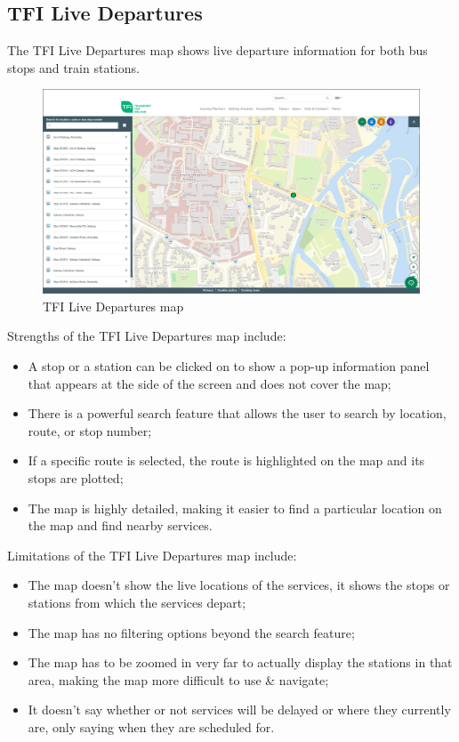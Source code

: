 \documentclass[a4paper,11pt]{report}
\begin{document}
\subsection{TFI Live Departures}
The TFI Live Departures map\supercite{tfilive} shows live departure information for both bus stops and train stations.
\begin{figure}[H]
    \centering
    \includegraphics[width=\textwidth]{../PDD/images/tfi.png}
    \caption{TFI Live Departures map}
\end{figure}

Strengths of the TFI Live Departures map include:
\begin{itemize}
    \item   A stop or a station can be clicked on to show a pop-up information panel that appears at the side of the screen and does not cover the map;
    \item   There is a powerful search feature that allows the user to search by location, route, or stop number;
    \item   If a specific route is selected, the route is highlighted on the map and its stops are plotted;
    \item   The map is highly detailed, making it easier to find a particular location on the map and find nearby services.
\end{itemize}

Limitations of the TFI Live Departures map include:
\begin{itemize}
    \item   The map doesn't show the live locations of the services, it shows the stops or stations from which the services depart;
    \item   The map has no filtering options beyond the search feature;
    \item   The map has to be zoomed in very far to actually display the stations in that area, making the map more difficult to use \& navigate;
    \item   It doesn't say whether or not services will be delayed or where they currently are, only saying when they are scheduled for.
\end{itemize}
\end{document}
